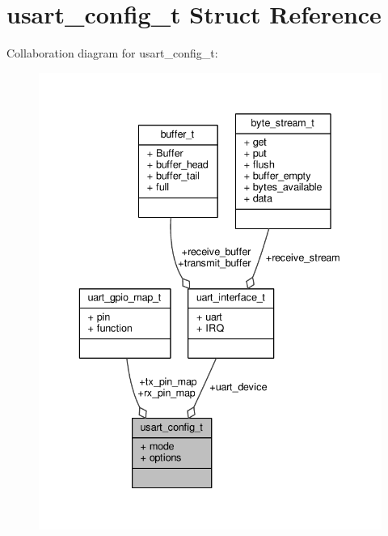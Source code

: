 \hypertarget{structusart__config__t}{\section{usart\+\_\+config\+\_\+t Struct Reference}
\label{structusart__config__t}
}


Collaboration diagram for usart\+\_\+config\+\_\+t\+:
\nopagebreak
\begin{figure}[H]
\begin{center}
\leavevmode
\includegraphics[width=336pt]{structusart__config__t__coll__graph}
\end{center}
\end{figure}
